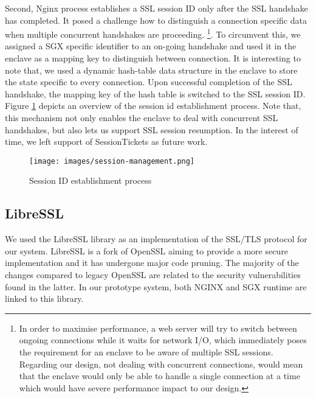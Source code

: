 \documentclass[../main.tex]{subfiles}
\begin{document}
Second, Nginx process establishes a SSL session ID only after the SSL handshake 
has completed. It posed a challenge how to distinguish a connection specific data 
when multiple concurrent handshakes are proceeding. \footnote{In order to 
maximise performance, a web server will try to switch between ongoing 
connections while it waits for network I/O, which immediately poses the
requirement for an enclave to be aware of multiple SSL sessions. Regarding
our design, not dealing with concurrent connections, would mean that the 
enclave would only be able to handle a single connection at a time which
would have severe performance impact to our design.}. To circumvent
this, we assigned a SGX specific identifier to an on-going handshake
and used it in the enclave as a mapping key to distinguish between 
connection. It is interesting to note that, we used a dynamic hash-table 
data structure in the enclave to store the state specific to every connection. 
Upon successful completion of the SSL handshake, the mapping
key of the hash table is switched to the SSL session ID. 
Figure \ref{fig:session-management} depicts an overview of 
the session id establishment process. Note that, this
mechanism not only enables the enclave to deal with concurrent SSL
handshakes, but also lets us support SSL session resumption. In the
interest of time, we left support of SessionTickets as future work. 

\begin{figure}[H]
  \centering
  \texttt{[image: images/session-management.png]}
  \caption{Session ID establishment process}
  \label{fig:session-management}
\end{figure}

\subsection{LibreSSL}
\label{subsec:libressl}
We used the LibreSSL library as an implementation of the SSL/TLS protocol for
our system. LibreSSL is a fork of OpenSSL aiming to provide a more secure
implementation and it has undergone major code pruning. The majority of the
changes compared to legacy OpenSSL are related to the security vulnerabilities
found in the latter. In our prototype system, both NGINX and SGX runtime are
linked to this library.
\end{document}
